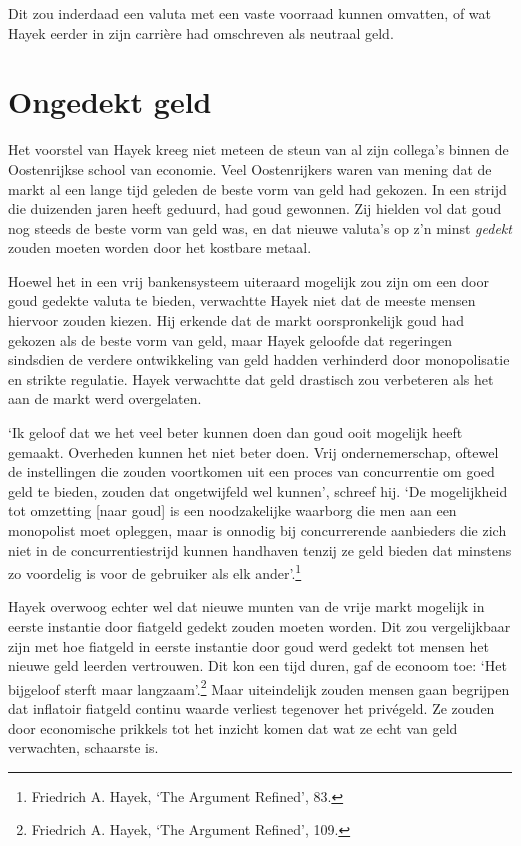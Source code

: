 \documentclass[smalldemyvopaper,11pt,twoside,onecolumn,openright,extrafontsizes,hidelinks]{memoir}
\begin{document}
Dit zou inderdaad een valuta met een vaste voorraad kunnen omvatten, of
wat Hayek eerder in zijn carrière had omschreven als neutraal geld.

\section{Ongedekt geld}\label{ongedekt-geld}

Het voorstel van Hayek kreeg niet meteen de steun van al zijn collega's
binnen de Oostenrijkse school van economie. Veel Oostenrijkers waren van
mening dat de markt al een lange tijd geleden de beste vorm van geld had
gekozen. In een strijd die duizenden jaren heeft geduurd, had goud
gewonnen. Zij hielden vol dat goud nog steeds de beste vorm van geld
was, en dat nieuwe valuta's op z'n minst \emph{gedekt} zouden moeten
worden door het kostbare metaal.

Hoewel het in een vrij bankensysteem uiteraard mogelijk zou zijn om een
door goud gedekte valuta te bieden, verwachtte Hayek niet dat de meeste
mensen hiervoor zouden kiezen. Hij erkende dat de markt oorspronkelijk
goud had gekozen als de beste vorm van geld, maar Hayek geloofde dat
regeringen sindsdien de verdere ontwikkeling van geld hadden verhinderd
door monopolisatie en strikte regulatie. Hayek verwachtte dat geld
drastisch zou verbeteren als het aan de markt werd overgelaten.

`Ik geloof dat we het veel beter kunnen doen dan goud ooit mogelijk
heeft gemaakt. Overheden kunnen het niet beter doen. Vrij
ondernemerschap, oftewel de instellingen die zouden voortkomen uit een
proces van concurrentie om goed geld te bieden, zouden dat ongetwijfeld
wel kunnen', schreef hij. `De mogelijkheid tot omzetting {[}naar goud{]}
is een noodzakelijke waarborg die men aan een monopolist moet opleggen,
maar is onnodig bij concurrerende aanbieders die zich niet in de
concurrentiestrijd kunnen handhaven tenzij ze geld bieden dat minstens
zo voordelig is voor de gebruiker als elk ander'.\footnote{Friedrich A.
  Hayek, `The Argument Refined', 83.}

Hayek overwoog echter wel dat nieuwe munten van de vrije markt mogelijk
in eerste instantie door fiatgeld gedekt zouden moeten worden. Dit zou
vergelijkbaar zijn met hoe fiatgeld in eerste instantie door goud werd
gedekt tot mensen het nieuwe geld leerden vertrouwen. Dit kon een tijd
duren, gaf de econoom toe: `Het bijgeloof sterft maar
langzaam'.\footnote{Friedrich A. Hayek, `The Argument Refined', 109.}
Maar uiteindelijk zouden mensen gaan begrijpen dat inflatoir fiatgeld
continu waarde verliest tegenover het privégeld. Ze zouden door
economische prikkels tot het inzicht komen dat wat ze echt van geld
verwachten, schaarste is.
\end{document}
